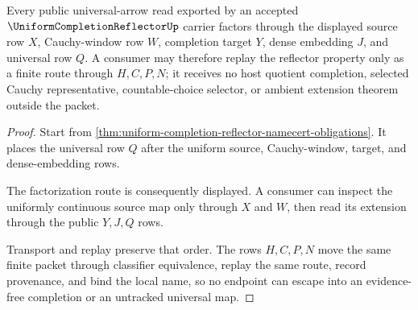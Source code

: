 \begin{theorem}
\label{thm:uniform-completion-reflector-universal-arrow}
Every public universal-arrow read exported by an accepted $\UniformCompletionReflectorUp$ carrier factors through the displayed source row $X$, Cauchy-window row $W$, completion target $Y$, dense embedding $J$, and universal row $Q$. A consumer may therefore replay the reflector property only as a finite route through $H,C,P,N$; it receives no host quotient completion, selected Cauchy representative, countable-choice selector, or ambient extension theorem outside the packet.
\end{theorem}
\begin{proof}
Start from \autoref{thm:uniform-completion-reflector-namecert-obligations}. It places the universal row $Q$ after the uniform source, Cauchy-window, target, and dense-embedding rows.

The factorization route is consequently displayed. A consumer can inspect the uniformly continuous source map only through $X$ and $W$, then read its extension through the public $Y,J,Q$ rows.

Transport and replay preserve that order. The rows $H,C,P,N$ move the same finite packet through classifier equivalence, replay the same route, record provenance, and bind the local name, so no endpoint can escape into an evidence-free completion or an untracked universal map.
\end{proof}




